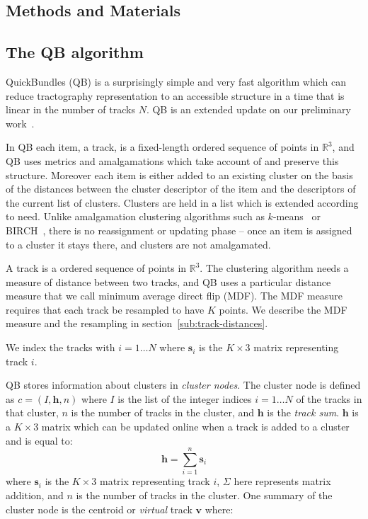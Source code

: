 \documentclass{bioinfo}
\begin{document}
\begin{methods}

\section{Methods and Materials}

\subsection{The QB algorithm\label{sub:QB-description}}

QuickBundles (QB) is a surprisingly simple and very fast algorithm which
can reduce tractography representation to an accessible structure in a
time that is linear in the number of tracks $N$. QB is an extended
update on our preliminary work~\citet{EGMB10}.

In QB each item, a track, is a fixed-length ordered sequence of points
in $\mathbb{R}^{3}$, and QB uses metrics and amalgamations which take
account of and preserve this structure.  Moreover each item is either
added to an existing cluster on the basis of the distances between the
cluster descriptor of the item and the descriptors of the current list of
clusters. Clusters are held in a list which is extended according to
need. Unlike amalgamation clustering algorithms such as
$k$-means~\citep{steinhaus1956division, macqueen1967some} or
BIRCH~\citep{zhang1997birch}, there is no reassignment or updating phase
-- once an item is assigned to a cluster it stays there, and clusters
are not amalgamated.

A track is a ordered sequence of points in $\mathbb{R}^{3}$.  The
clustering algorithm needs a measure of distance between two tracks, and
QB uses a particular distance measure that we call minimum average
direct flip (MDF).  The MDF measure requires that each track be
resampled to have $K$ points. We describe the MDF measure and the
resampling in section~\ref{sub:track-distances}.

We index the tracks with $i = 1 \dots N$ where $\mathbf{s}_{i}$ is the
$K\times3$ matrix representing track $i$.

QB stores information about clusters in \emph{cluster nodes}.  The
cluster node is defined as $c=(I,\mathbf{h},n)$ where $I$ is the list of
the integer indices $i = 1 \dots N$ of the tracks in that cluster, $n$
is the number of tracks in the cluster, and $\mathbf{h}$ is the \emph{track
  sum}. $\mathbf{h}$ is a $K \times3$ matrix which can be updated online
when a track is added to a cluster and is equal to:
\begin{equation}
  \mathbf{h}=\sum_{i=1}^{n}\mathbf{s}_{i}
\end{equation} 
where $\mathbf{s}_{i}$ is the $K\times3$ matrix representing track $i$,
$\Sigma$ here represents matrix addition, and $n$ is the number of
tracks in the cluster. One summary of the cluster node is the centroid or
\emph{virtual} track $\mathbf{v}$ where:


\end{methods}
\end{document}
